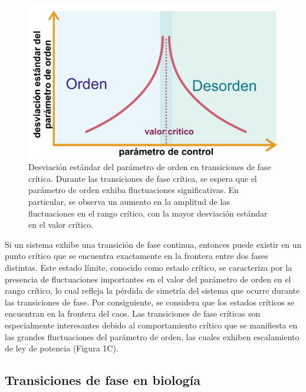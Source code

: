 \begin{figure}[ht]
	\centering\includegraphics[width=\imsize]{transiciones_fases_tipo_II_divergencia}
	\caption[Desviación estándar del parámetro de orden en transiciones de fase crítica.]{Desviación estándar del parámetro de orden en transiciones de fase crítica. Durante las transiciones de fase crítica, se espera que el parámetro de orden exhiba fluctuaciones significativas. En particular, se observa un aumento en la amplitud de las fluctuaciones en el rango crítico, con la mayor desviación estándar en el valor crítico.} 	\label{fig:divergencia}
\end{figure}


Si un sistema exhibe una transición de fase continua, entonces puede existir en un punto crítico que se encuentra exactamente en la frontera entre dos fases distintas. Este estado límite, conocido como estado crítico, se caracteriza por la presencia de fluctuaciones importantes en el valor del parámetro de orden en el rango crítico, lo cual refleja la pérdida de simetría del sistema que ocurre durante las transiciones de fase. Por consiguiente, se considera que los estados críticos se encuentran en la frontera del caos. Las transiciones de fase críticas son especialmente interesantes debido al comportamiento crítico que se manifiesta en las grandes fluctuaciones del parámetro de orden, las cuales exhiben escalamiento de ley de potencia (Figura 1C).



\subsection{Transiciones de fase en biología}


